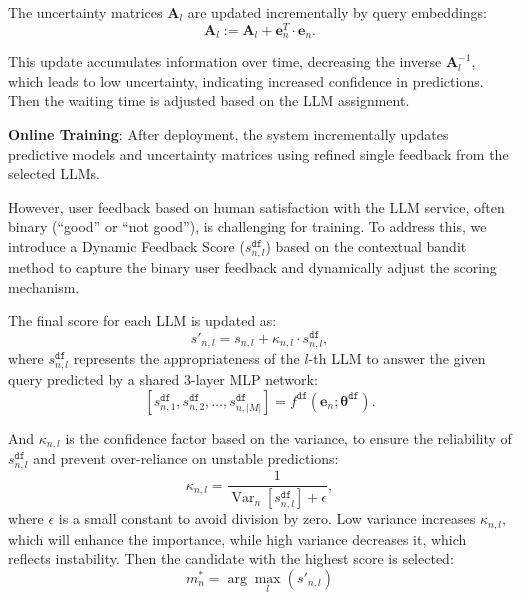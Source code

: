 The uncertainty matrices \( \mathbf{A}_l \) are updated incrementally by query embeddings:
\begin{equation}
    \mathbf{A}_l := \mathbf{A}_l + \mathbf{e}_n^T \cdot \mathbf{e}_n.
    \label{uncupdate}
\end{equation}

This update accumulates information over time, decreasing the inverse \( \mathbf{A}_l^{-1} \), which leads to low uncertainty, indicating increased confidence in predictions.
Then the waiting time is adjusted based on the LLM assignment.


\textbf{Online Training}: 
After deployment, the system incrementally updates predictive models and uncertainty matrices using refined single feedback from the selected LLMs.

However, user feedback based on human satisfaction with the LLM service, often binary (``good'' or ``not good''), is challenging for training. To address this, we introduce a Dynamic Feedback Score (\( s_{n,l}^{\texttt{df}} \)) based on the contextual bandit method to capture the binary user feedback and dynamically adjust the scoring mechanism.

The final score for each LLM is updated as:
\begin{equation} \label{updated_final_scores}
    s'_{n,l} = s_{n,l} + \kappa_{n,l} \cdot s_{n,l}^{\texttt{df}},
\end{equation}
where $s_{n,l}^{\texttt{df}}$ represents the appropriateness of the $l$-th LLM to answer the given query predicted by a shared 3-layer MLP network:
\begin{equation}
    \left[ s_{n,1}^{\texttt{df}}, s_{n,2}^{\texttt{df}}, \dots, s_{n,|M|}^{\texttt{df}} \right] = f^{\texttt{df}}(\mathbf{e}_n; \boldsymbol{\theta}^{\texttt{df}}).
\end{equation}

And \( \kappa_{n,l} \) is the confidence factor based on the variance, to ensure the reliability of $s_{n,l}^{\texttt{df}}$ and prevent over-reliance on unstable predictions:
\begin{equation}
    \kappa_{n,l} = \frac{1}{\operatorname{Var}_n[s_{n,l}^{\texttt{df}}] + \epsilon},
\end{equation}
where \( \epsilon \) is a small constant to avoid division by zero. Low variance increases \( \kappa_{n,l} \), which will enhance the importance, while high variance decreases it, which reflects instability.
Then the candidate with the highest score is selected:
\begin{equation}
    m_n^* = \arg\max_{l} (s'_{n,l})
\end{equation}

